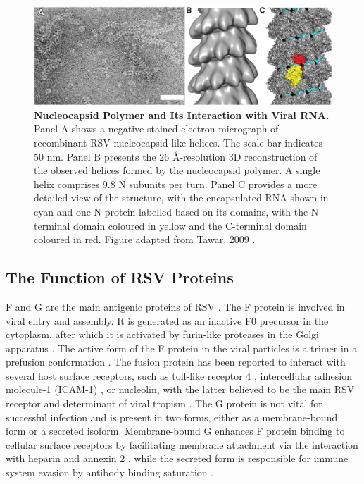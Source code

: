 \begin{figure}
    \centering
    \includegraphics[width=1\linewidth]{04. Introduction//Figs/08. N-structure.jpeg}
    \caption[Nucleocapsid Polymer and Its Interaction with Viral RNA.]{\textbf{Nucleocapsid Polymer and Its Interaction with Viral RNA.} Panel A shows a negative-stained electron micrograph of recombinant RSV nucleocapsid-like helices. The scale bar indicates 50 nm. Panel B presents the 26 \r{A}-resolution 3D reconstruction of the observed helices formed by the nucleocapsid polymer. A single helix comprises 9.8 N subunits per turn. Panel C provides a more detailed view of the structure, with the encapsulated RNA shown in cyan and one N protein labelled based on its domains, with the N-terminal domain coloured in yellow and the C-terminal domain coloured in red. Figure adapted from Tawar, 2009 \cite{Tawar2009CrystalVirus}.}
    \label{fig:Nucleocapsid Polymer and Its Interaction with Viral RNA}
\end{figure}

\subsection{The Function of RSV Proteins} \label{subsec:The Function of RSV Proteins}
F and G are the main antigenic proteins of RSV \cite{Collins2011ProgressYears, Battles2019RespiratoryIt}. The F protein is involved in viral entry and assembly. It is generated as an inactive F0 precursor in the cytoplasm, after which it is activated by furin-like proteases in the Golgi apparatus \cite{Collins1984NucleotideVirus.}. The active form of the F protein in the viral particles is a trimer in a prefusion conformation \cite{Ternette2007ImmunogenicityVirus}. The fusion protein has been reported to interact with several host surface receptors, such as toll-like receptor 4 \cite{Marr2012RoleReplication}, intercellular adhesion molecule-1 (ICAM-1) \cite{Behera2001BlockingInfection}, or nucleolin, with the latter believed to be the main RSV receptor and determinant of viral tropism \cite{Tayyari2011IdentificationVirus}. The G protein is not vital for successful infection and is present in two forms, either as a membrane-bound form or a secreted isoform. Membrane-bound G enhances F protein binding to cellular surface receptors by facilitating membrane attachment via the interaction with heparin and annexin 2 \cite{Collins2013RespiratoryDisease, Krusat1997Heparin-dependentCells, Malhotra2003IsolationCells}, while the secreted form is responsible for immune system evasion by antibody binding saturation \cite{Bukreyev2008TheLeukocytes}. 

